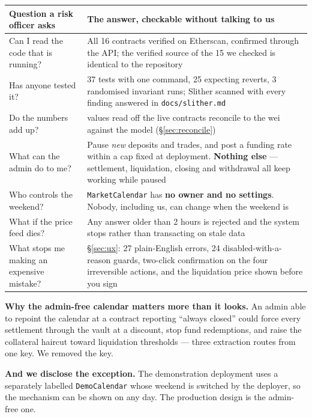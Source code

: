 \documentclass[11pt,a4paper]{article}
\begin{document}
\begin{center}
\small
\begin{tabular}{@{}p{4.6cm}p{10.6cm}@{}}
\toprule
\textbf{Question a risk officer asks} & \textbf{The answer, checkable without talking to us} \\
\midrule
Can I read the code that is running? & All 16 contracts verified on Etherscan, confirmed through the API; the verified source of the 15 we checked is identical to the repository \\
Has anyone tested it? & 37 tests with one command, 25 expecting reverts, 3 randomised invariant runs; Slither scanned with every finding answered in \texttt{docs/slither.md} \\
Do the numbers add up? & \reconCount{} values read off the live contracts reconcile to the wei against the model (\S\ref{sec:reconcile}) \\
What can the admin do to me? & Pause \emph{new} deposits and trades, and post a funding rate within a cap fixed at deployment. \textbf{Nothing else} --- settlement, liquidation, closing and withdrawal all keep working while paused \\
Who controls the weekend? & \texttt{MarketCalendar} has \textbf{no owner and no settings}. Nobody, including us, can change when the weekend is \\
What if the price feed dies? & Any answer older than 2 hours is rejected and the system stops rather than transacting on stale data \\
What stops me making an expensive mistake? & \S\ref{sec:ux}: 27 plain-English errors, 24 disabled-with-a-reason guards, two-click confirmation on the four irreversible actions, and the liquidation price shown before you sign \\
\bottomrule
\end{tabular}
\end{center}

\textbf{Why the admin-free calendar matters more than it looks.} An admin able to repoint the
calendar at a contract reporting ``always closed'' could force every settlement through the vault at
a discount, stop fund redemptions, and raise the collateral haircut toward liquidation thresholds —
three extraction routes from one key. We removed the key.

\textbf{And we disclose the exception.} The demonstration deployment uses a separately labelled
\texttt{DemoCalendar} whose weekend is switched by the deployer, so the mechanism can be shown on any
day. The production design is the admin-free one.
\end{document}
